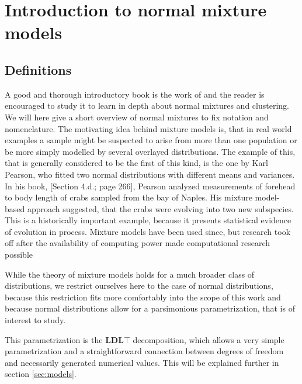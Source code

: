 \chapter{Introduction to normal mixture models}





\section{Definitions}
\label{sec:def}

A good and thorough introductory book is the work of \cite{McL00} and
the reader is encouraged to study it to learn in depth about normal mixtures
and clustering. 
We will here give a short overview of normal mixtures to fix notation and 
nomenclature.
The motivating idea behind mixture models is, that in real world examples
a sample might be suspected to arise from more than one population or be 
more simply modelled by several overlayed distributions.
The example of this, that is generally considered to be the first of this kind,
is the one by Karl Pearson, who fitted two normal distributions with different 
means and variances.
In his book, \cite{Pea96}[Section 4.d.; page 266], Pearson analyzed measurements
of forehead to body length of crabs sampled from the bay of Naples. His mixture 
model-based approach suggested, that the crabs were evolving into two new 
subspecies.
This is a historically important example, because it presents statistical 
evidence of evolution in process.
Mixture models have been used since, but research took off after the 
availability of computing power made computational research possible

While the theory of mixture models holds for a much broader class of 
distributions, we restrict ourselves here to the case of normal distributions,
because this restriction fits more comfortably into the scope of this work and 
because normal distributions allow for a parsimonious parametrization, that is 
of interest to study.

This parametrization is the $\pmb{LDL}\top$ decomposition, which allows a very 
simple parametrization and a straightforward connection between degrees of 
freedom and necessarily generated numerical values. This will be explained 
further in section \ref{sec:models}.

